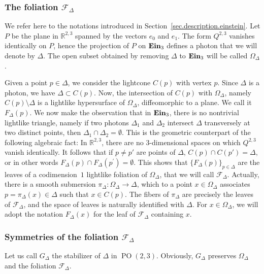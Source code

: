 \documentclass[11pt]{article}
\theoremstyle{definition}
\numberwithin{equation}{section}
\numberwithin{figure}{section}
\numberwithin{table}{section}
\DeclareMathOperator{\ein}{{\bf Ein}_3}
\newcommand{\calfd}{{{\mathcal{F}}}_{\Delta}}
\newcommand*\D{{\Delta}}
\newcommand*\RR{\mathbb{R}}
\DeclareMathOperator{\POop}{PO}
\newcommand{\PO}{{\POop(2,3)}}
\begin{document}
\subsubsection{The foliation \texorpdfstring{$\calfd$}{calfd}}\label{sec.foliation-einstein}
We refer here to the notations introduced in Section~\ref{sec.description.einstein}. Let $P$ be the plane in $\RR^{2,3}$ spanned by the vectors $e_0$ and $e_1$. The form $Q^{2,3}$ vanishes identically on $P$, hence the projection of $P$ on $\ein$ defines a photon that we will denote by $\Delta$. The open subset obtained by removing $\Delta$ to $\ein$ will be called $\Omega_{\D}$.

Given a point $p \in \D$, we consider the lightcone $C(p)$ with vertex $p$. Since $\D$ is a photon, we have $\D \subset C(p)$. Now, the intersection of $C(p)$ with $\Omega_{\D}$, namely $C(p) \setminus \Delta$ is a lightlike hypersurface of $\Omega_{\D}$, diffeomorphic to a plane. We call it $F_{\D}(p)$. We now make the observation that in $\ein$, there is no nontrivial lightlike triangle, namely if two photons $\D_1$ and $\D_2$ intersect $\Delta$ transversely at two distinct points, then $\D_1 \cap \D_2 = \emptyset$. This is the geometric counterpart of the following algebraic fact: In $\RR^{2,3}$, there are no $3$-dimensional spaces on which $Q^{2,3}$ vanish identically. It follows that if $p \not= p'$ are points of $\D$, $C(p) \cap C(p')=\Delta$, or in other words $F_{\Delta}(p) \cap F_{\Delta}(p^{\prime}) = \emptyset$. This shows that $\{ F_{\Delta}(p) \}_{p \in \D}$ are the leaves of a codimension~$1$ lightlike foliation of $\Omega_{\D}$, that we will call $\calfd$. Actually, there is a smooth submersion $\pi_{\Delta} : \Omega_{\Delta} \to \Delta$, which to a point $x \in \Omega_{\Delta}$ associates $p=\pi_{\Delta}(x) \in \Delta$ such that $x \in C(p)$. The fibers of $\pi_{\Delta}$ are precisely the leaves of $\calfd$, and the space of leaves is naturally identified with $\Delta$. For $x \in \Omega_{\Delta}$, we will adopt the notation $F_{\Delta}(x)$ for the leaf of $\calfd$ containing $x$.

\subsubsection{Symmetries of the foliation \texorpdfstring{$\calfd$}{calfd}}\label{sec.symetries}
Let us call $G_{\Delta}$ the stabilizer of $\D$ in $\PO$. Obviously, $G_{\Delta}$ preserves $\Omega_{\Delta}$ and the foliation $\calfd$.
\end{document}
